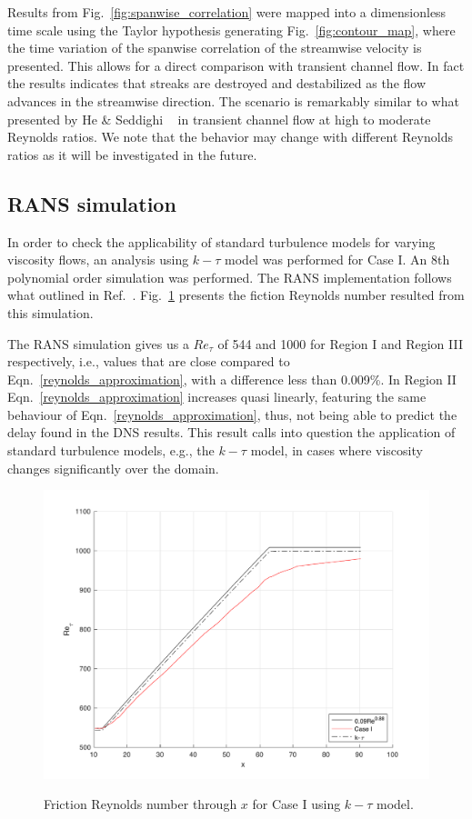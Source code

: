 \documentclass[twocolumn,10pt]{asme2e}
\begin{document}
Results from Fig.~\ref{fig:spanwise_correlation} were mapped into a dimensionless time scale using the Taylor hypothesis generating Fig.~\ref{fig:contour_map}, where the time variation of the spanwise correlation of the streamwise velocity is presented. This allows for a direct comparison with transient channel flow. In fact the results indicates that streaks are destroyed and destabilized as the flow advances  in the streamwise direction. The scenario is remarkably similar to what presented by He \& Seddighi ~\cite{he2015} in transient channel flow at high to moderate Reynolds ratios.  We note that the behavior may change with different Reynolds ratios as it will be investigated in the future.

\subsection*{RANS simulation}

In order to check the applicability of standard turbulence models for varying viscosity flows, an analysis using \(k-\tau\) model was performed for Case I. An 8th polynomial order simulation was performed. The RANS implementation follows what outlined in Ref.~\cite{Tomboulidesa2018}. Fig.~\ref{fig:Re_RANS} presents the fiction Reynolds number resulted from this simulation.

The RANS simulation gives us a \(Re_{\tau}\) of 544 and 1000 for Region I and Region III respectively, i.e., values that are close compared to Eqn.~\ref{reynolds_approximation}, with a difference less than 0.009\%. In Region II Eqn.~\ref{reynolds_approximation} increases quasi linearly, featuring the same behaviour of Eqn.~\ref{reynolds_approximation}, thus, not being able to predict the delay found in the DNS results. This result calls into question the application of standard turbulence models, e.g., the \(k-\tau\) model, in cases where viscosity changes significantly over the domain.

\begin{figure}[t]
\centering
\scalebox{0.5}
{\includegraphics{k_tau.pdf}}
\caption{Friction Reynolds number through \(x\) for Case I using \(k-\tau\) model.}
\label{fig:Re_RANS}
\end{figure}
\end{document}
